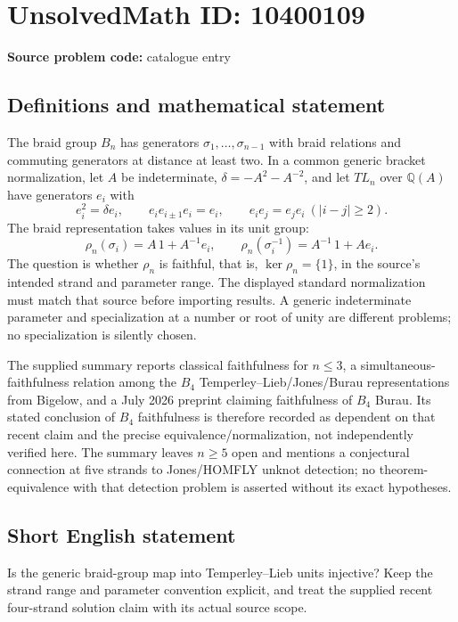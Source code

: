 \documentclass[11pt]{article}
\newcommand{\Q}{\mathbb{Q}}
\begin{document}
\section*{UnsolvedMath ID: 10400109}
\textbf{Source problem code:} catalogue entry
\subsection{Definitions and mathematical statement}
The braid group $B_n$ has generators $\sigma_1,\ldots,\sigma_{n-1}$ with braid relations and commuting generators at distance at least two. In a common generic bracket normalization, let $A$ be indeterminate, $\delta=-A^2-A^{-2}$, and let $TL_n$ over $\Q(A)$ have generators $e_i$ with
\[
e_i^2=\delta e_i,\qquad e_ie_{i\pm1}e_i=e_i,\qquad e_ie_j=e_je_i\ (|i-j|\geq2).
\]
The braid representation takes values in its unit group:
\[
\rho_n(\sigma_i)=A\,1+A^{-1}e_i,\qquad
\rho_n(\sigma_i^{-1})=A^{-1}\,1+Ae_i.
\]
The question is whether $\rho_n$ is faithful, that is, $\ker\rho_n=\{1\}$, in the source's intended strand and parameter range. The displayed standard normalization must match that source before importing results. A generic indeterminate parameter and specialization at a number or root of unity are different problems; no specialization is silently chosen.

The supplied summary reports classical faithfulness for $n\leq3$, a simultaneous-faithfulness relation among the $B_4$ Temperley--Lieb/Jones/Burau representations from Bigelow, and a July 2026 preprint claiming faithfulness of $B_4$ Burau. Its stated conclusion of $B_4$ faithfulness is therefore recorded as dependent on that recent claim and the precise equivalence/normalization, not independently verified here. The summary leaves $n\geq5$ open and mentions a conjectural connection at five strands to Jones/HOMFLY unknot detection; no theorem-equivalence with that detection problem is asserted without its exact hypotheses.
\subsection{Short English statement}
Is the generic braid-group map into Temperley--Lieb units injective? Keep the strand range and parameter convention explicit, and treat the supplied recent four-strand solution claim with its actual source scope.
\end{document}
